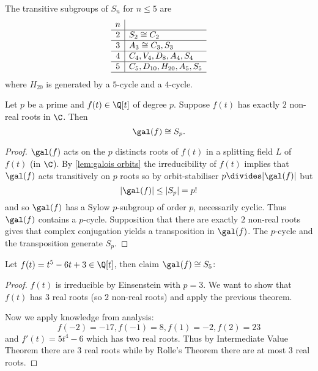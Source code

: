 \documentclass[a4paper]{article}
\begin{document}
\begin{lemma}
  The transitive subgroups of \(S_n\) for \(n \leq 5\) are
  \[
  \begin{array}[h]{c|l}
    n & \\ \hline
    2 & S_2 \cong C_2 \\ \hline
    3 & A_3 \cong C_3, S_3 \\ \hline
    4 & C_4, V_4, D_8, A_4, S_4 \\ \hline
    5 & C_5, D_{10}, H_{20}, A_5, S_5 \\ \hline
  \end{array}
  \]
  where \(H_{20}\) is generated by a \(5\)-cycle and a \(4\)-cycle.
\end{lemma}

\begin{theorem}
  Let \(p\) be a prime and \(f(t) \in \Q[t]\) of degree \(p\). Suppose \(f(t)\) has exactly \(2\) non-real roots in \(\C\). Then
  \[
    \gal(f) \cong S_p.
  \]
\end{theorem}

\begin{proof}
  \(\gal(f)\) acts on the \(p\) distincts roots of \(f(t)\) in a splitting field \(L\) of \(f(t)\) (in \(\C\)). By \autoref{lem:galois orbits} the irreducibility of \(f(t)\) implies that \(\gal(f)\) acts transitively on \(p\) roots so by orbit-stabiliser \(p \divides |\gal(f)|\) but
  \[
    |\gal(f)| \leq |S_p| = p!
  \]
  and so \(\gal(f)\) has a Sylow \(p\)-subgroup of order \(p\), necessarily cyclic. Thus \(\gal(f)\) contains a \(p\)-cycle. Supposition that there are exactly \(2\) non-real roots gives that complex conjugation yields a transposition in \(\gal(f)\). The \(p\)-cycle and the transposition generate \(S_p\).
\end{proof}

\begin{eg}
  Let \(f(t) = t^5 - 6t + 3 \in \Q[t]\), then claim \(\gal(f) \cong S_5\):

  \begin{proof}
    \(f(t)\) is irreducible by Einsenstein with \(p = 3\). We want to show that \(f(t)\) has \(3\) real roots (so \(2\) non-real roots) and apply the previous theorem.

    Now we apply knowledge from analysis:
    \[
      f(-2) = -17, f(-1) = 8, f(1) = -2, f(2) = 23
    \]
    and \(f'(t) = 5t^4 - 6\) which has two real roots. Thus by Intermediate Value Theorem there are \(3\) real roots while by Rolle's Theorem there are at most \(3\) real roots.
  \end{proof}
\end{eg}
\end{document}
